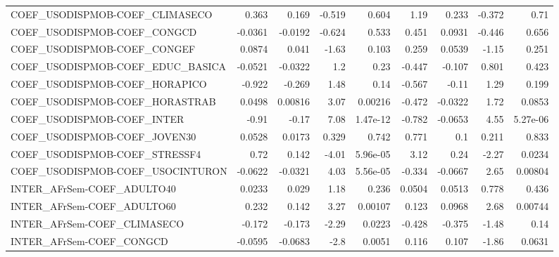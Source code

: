 \begin{tabular}{lrrrrrrrr}
COEF\_USODISPMOB-COEF\_CLIMASECO        &       0.363 &        0.169 &   -0.519 &    0.604 &       1.19 &       0.233 &       -0.372 &          0.71 \\
COEF\_USODISPMOB-COEF\_CONGCD           &     -0.0361 &      -0.0192 &   -0.624 &    0.533 &      0.451 &      0.0931 &       -0.446 &         0.656 \\
COEF\_USODISPMOB-COEF\_CONGEF           &      0.0874 &        0.041 &    -1.63 &    0.103 &      0.259 &      0.0539 &        -1.15 &         0.251 \\
COEF\_USODISPMOB-COEF\_EDUC\_BASICA      &     -0.0521 &      -0.0322 &      1.2 &     0.23 &     -0.447 &      -0.107 &        0.801 &         0.423 \\
COEF\_USODISPMOB-COEF\_HORAPICO         &      -0.922 &       -0.269 &     1.48 &     0.14 &     -0.567 &       -0.11 &         1.29 &         0.199 \\
COEF\_USODISPMOB-COEF\_HORASTRAB        &      0.0498 &      0.00816 &     3.07 &  0.00216 &     -0.472 &     -0.0322 &         1.72 &        0.0853 \\
COEF\_USODISPMOB-COEF\_INTER            &       -0.91 &        -0.17 &     7.08 & 1.47e-12 &     -0.782 &     -0.0653 &         4.55 &      5.27e-06 \\
COEF\_USODISPMOB-COEF\_JOVEN30          &      0.0528 &       0.0173 &    0.329 &    0.742 &      0.771 &         0.1 &        0.211 &         0.833 \\
COEF\_USODISPMOB-COEF\_STRESSF4         &        0.72 &        0.142 &    -4.01 & 5.96e-05 &       3.12 &        0.24 &        -2.27 &        0.0234 \\
COEF\_USODISPMOB-COEF\_USOCINTURON      &     -0.0622 &      -0.0321 &     4.03 & 5.56e-05 &     -0.334 &     -0.0667 &         2.65 &       0.00804 \\
INTER\_AFrSem-COEF\_ADULTO40            &      0.0233 &        0.029 &     1.18 &    0.236 &     0.0504 &      0.0513 &        0.778 &         0.436 \\
INTER\_AFrSem-COEF\_ADULTO60            &       0.232 &        0.142 &     3.27 &  0.00107 &      0.123 &      0.0968 &         2.68 &       0.00744 \\
INTER\_AFrSem-COEF\_CLIMASECO           &      -0.172 &       -0.173 &    -2.29 &   0.0223 &     -0.428 &      -0.375 &        -1.48 &          0.14 \\
INTER\_AFrSem-COEF\_CONGCD              &     -0.0595 &      -0.0683 &     -2.8 &   0.0051 &      0.116 &       0.107 &        -1.86 &        0.0631 \\

\end{tabular}
